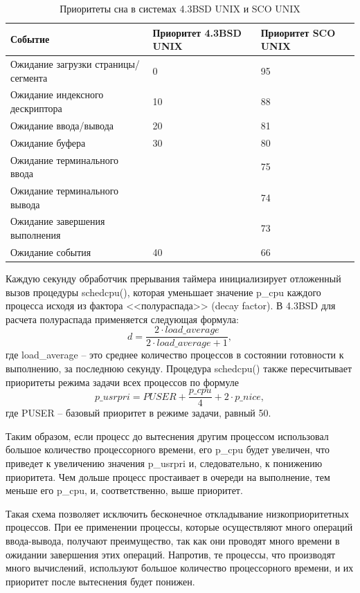 \documentclass[a4paper, 12pt]{extreport}
\begin{document}
\begin{table}[h]
	\caption{Приоритеты сна в системах 4.3BSD UNIX и SCO UNIX}
	\begin{center}
		\begin{tabular}{|l|p{75pt}|p{75pt}|} 
			\hline
			\textbf{Событие} & \textbf{Приоритет 4.3BSD UNIX} & \textbf{Приоритет SCO UNIX}\\
			\hline
			{Ожидание загрузки страницы/сегмента} & 0 & 95\\
			\hline
			{Ожидание индексного дескриптора} & 10 & 88\\
			\hline
			{Ожидание ввода/вывода} & 20 & 81 \\
			\hline
			{Ожидание буфера} & 30 & 80\\
			\hline
			{Ожидание терминального ввода} &    & 75\\
			\hline
			{Ожидание терминального вывода} &    & 74\\
			\hline
			{Ожидание завершения выполнения} &    & 73\\
			\hline
			{Ожидание события} & 40 & 66\\
			\hline
		\end{tabular}
	\end{center}
	\label{tbl:sleeppriority}
\end{table}


Каждую секунду обработчик прерывания таймера инициализирует отложенный вызов процедуры {\ttfamily schedcpu()}, которая 
уменьшает значение {\ttfamily p{\_}cpu} каждого процесса исходя из фактора <<полураспада>> (decay factor). В {\ttfamily 4.3BSD} 
для расчета полураспада применяется следующая формула:
\[
d = \frac{2\cdot load{\_}average}{2\cdot load{\_}average + 1},
\]
где  {\ttfamily load{\_}average} -- это среднее количество процессов в состоянии готовности к выполнению, за последнюю 
секунду. Процедура {\ttfamily schedcpu()} также пересчитывает приоритеты режима задачи всех процессов по формуле
\[
{p\_usrpri} = PUSER + \frac{p{\_}cpu}{4} + 2\cdot {p{\_}nice},
\]
где {\ttfamily PUSER} -- базовый приоритет в режиме задачи, равный 50.

Таким образом, если процесс до вытеснения другим процессом использовал большое количество процессорного времени, его 
{\ttfamily p{\_}cpu} будет увеличен, что приведет к увеличению значения {\ttfamily p{\_}usrpri} и, следовательно, к понижению 
приоритета. Чем дольше процесс простаивает в очереди на выполнение, тем меньше его {\ttfamily p{\_}cpu}, и, соответственно, 
выше приоритет. 

Такая схема позволяет исключить бесконечное откладывание низкоприоритетных процессов. При ее применении процессы, 
которые осуществляют много операций ввода-вывода, получают преимущество, так как они проводят много времени в 
ожидании завершения этих операций. Напротив, те процессы, что производят много вычислений, используют большое 
количество процессорного времени, и их приоритет после вытеснения будет понижен. 
\end{document}
